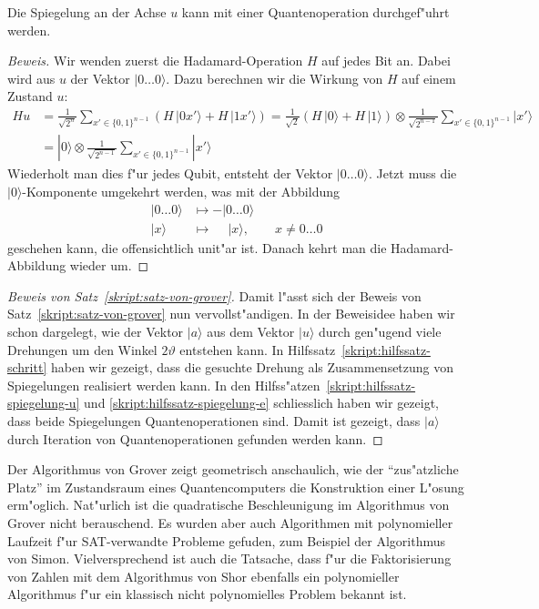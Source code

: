 \begin{hilfssatz}
Die Spiegelung an der Achse $u$ kann mit einer Quantenoperation
durchgef"uhrt werden.
\label{skript:hilfssatz-spiegelung-u}
\end{hilfssatz}

\begin{proof}[Beweis]
Wir wenden zuerst die Hadamard-Operation $H$ auf jedes Bit an.
Dabei wird aus $u$ der Vektor $|0\dots 0\rangle$.
Dazu berechnen wir die Wirkung von $H$ auf einem Zustand $u$:
\begin{align*}
Hu
&=
\frac1{\sqrt{2^n}}\sum_{x'\in\{0,1\}^{n-1}}(H\,|0x'\rangle + H\,|1x'\rangle)
=
\frac1{\sqrt{2}}(H\,|0\rangle + H\,|1\rangle)\otimes
  \frac1{\sqrt{2^{n-1}}}\sum_{x'\in\{0,1\}^{n-1}} |x'\rangle
\\
&=
|0\rangle\otimes
  \frac1{\sqrt{2^{n-1}}}\sum_{x'\in\{0,1\}^{n-1}} |x'\rangle
\end{align*}
Wiederholt man dies f"ur jedes Qubit, entsteht der Vektor $|0\dots 0\rangle$.
Jetzt muss die $|0\rangle$-Komponente umgekehrt werden, was mit der Abbildung
\begin{align*}
|0\dots0\rangle&\mapsto          - |0\dots0\rangle\\
|x\rangle      &\mapsto \phantom{-}|x\rangle,\qquad x\ne 0\dots 0
\end{align*}
geschehen kann, die offensichtlich unit"ar ist.
Danach kehrt man die Hadamard-Abbildung wieder um.
\end{proof}

\begin{proof}[Beweis von Satz~\ref{skript:satz-von-grover}]
Damit l"asst sich der Beweis von Satz~\ref{skript:satz-von-grover}
nun vervollst"andigen.
In der Beweisidee haben wir schon dargelegt, wie der Vektor
$|a\rangle$ aus dem Vektor $|u\rangle$ durch gen"ugend viele
Drehungen um den Winkel $2\vartheta$ entstehen kann.
In Hilfssatz~\ref{skript:hilfssatz-schritt} haben wir gezeigt, dass
die gesuchte Drehung als Zusammensetzung von Spiegelungen realisiert
werden kann.
In den Hilfss"atzen~\ref{skript:hilfssatz-spiegelung-u} und
\ref{skript:hilfssatz-spiegelung-e} schliesslich haben wir gezeigt,
dass beide Spiegelungen Quantenoperationen sind.
Damit ist gezeigt, dass $|a\rangle$ durch Iteration von
Quantenoperationen gefunden werden kann.
\end{proof}

Der Algorithmus von Grover zeigt geometrisch anschaulich, wie der
``zus"atzliche Platz'' im Zustandsraum eines Quantencomputers
die Konstruktion einer L"osung erm"oglich.
Nat"urlich ist die quadratische Beschleunigung im Algorithmus
von Grover nicht berauschend.
Es wurden aber auch Algorithmen mit polynomieller Laufzeit f"ur
SAT-verwandte Probleme gefuden, zum Beispiel der Algorithmus von
Simon.
Vielversprechend ist auch die Tatsache, dass f"ur die Faktorisierung
von Zahlen mit dem Algorithmus von Shor \cite{skript:arorabarak}
ebenfalls ein polynomieller Algorithmus f"ur ein klassisch
nicht polynomielles Problem bekannt ist.

